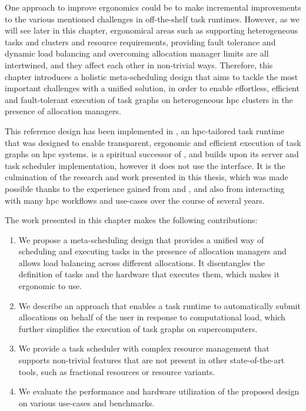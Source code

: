 One approach to improve ergonomics could be to make incremental improvements to the various
mentioned challenges in off-the-shelf task runtimes. However, as we will see later in this chapter,
ergonomical areas such as supporting heterogeneous tasks and clusters and resource requirements,
providing fault tolerance and dynamic load balancing and overcoming allocation manager limits are
all intertwined, and they affect each other in non-trivial ways. Therefore, this chapter introduces
a holistic meta-scheduling design that aims to tackle the most important challenges with a unified
solution, in order to enable effortless, efficient and fault-tolerant execution of task graphs on
heterogeneous \gls{hpc} clusters in the presence of allocation managers.

This reference design has been implemented in \hyperqueue{}, an
\gls{hpc}-tailored task runtime that was designed to enable transparent, ergonomic and
efficient execution of task graphs on \gls{hpc} systems. \hyperqueue{} is a
spiritual successor of \rsds{}, and builds upon its server and task scheduler
implementation, however it does not use the \dask{} interface. It is the culmination
of the research and work presented in this thesis, which was made possible thanks to the experience
gained from \estee{} and \rsds{}, and also from interacting with many
\gls{hpc} workflows and use-cases over the course of several years.

The work presented in this chapter makes the following contributions:
\begin{enumerate}
	\item We propose a meta-scheduling design that provides a unified way of scheduling and executing tasks
	      in the presence of allocation managers and allows load balancing across different allocations. It
	      disentangles the definition of tasks and the hardware that executes them, which makes it ergonomic
	      to use.
	\item We describe an approach that enables a task runtime to automatically submit allocations on behalf
	      of the user in response to computational load, which further simplifies the execution of task
	      graphs on supercomputers.
	\item We provide a task scheduler with complex resource management that supports non-trivial features
	      that are not present in other state-of-the-art tools, such as fractional resources or resource
	      variants.
	\item We evaluate the performance and hardware utilization of the proposed design on various use-cases
	      and benchmarks.
\end{enumerate}

